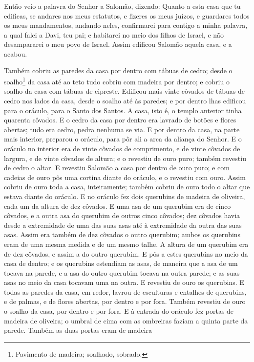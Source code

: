 Então veio a palavra do Senhor a Salomão, dizendo: Quanto
a esta casa que tu edificas, se andares nos meus estatutos, e
fizeres os meus juízos, e guardares todos os meus mandamentos,
andando neles, confirmarei para contigo a minha palavra, a qual
falei a Davi, teu pai; e habitarei no meio dos filhos de
Israel, e não desampararei o meu povo de Israel. Assim
edificou Salomão aquela casa, e a acabou.

Também cobriu as paredes da casa por dentro com tábuas de cedro;
desde o soalho\footnote{Pavimento de madeira; soalhado, sobrado.} da
casa até ao teto tudo cobriu com madeira por dentro; e cobriu o
soalho da casa com tábuas de cipreste. Edificou mais vinte
côvados de tábuas de cedro nos lados da casa, desde o soalho até às
paredes; e por dentro lhas edificou para o oráculo, para o Santo dos
Santos. A casa, isto é, o templo anterior tinha quarenta
côvados. E o cedro da casa por dentro era lavrado de botões e
flores abertas; tudo era cedro, pedra nenhuma se via. E por
dentro da casa, na parte mais interior, preparou o oráculo, para pôr
ali a arca da aliança do Senhor. E o oráculo no interior era
de vinte côvados de comprimento, e de vinte côvados de largura, e de
vinte côvados de altura; e o revestiu de ouro puro; também revestiu
de cedro o altar. E revestiu Salomão a casa por dentro de
ouro puro; e com cadeias de ouro pôs uma cortina diante do oráculo,
e o revestiu com ouro. Assim cobriu de ouro toda a casa,
inteiramente; também cobriu de ouro todo o altar que estava diante
do oráculo. E no oráculo fez dois querubins de madeira de
oliveira, cada um da altura de dez côvados. E uma asa de um
querubim era de cinco côvados, e a outra asa do querubim de outros
cinco côvados; dez côvados havia desde a extremidade de uma das suas
asas até à extremidade da outra das suas asas. Assim era
também de dez côvados o outro querubim; ambos os querubins eram de
uma mesma medida e de um mesmo talhe. A altura de um querubim
era de dez côvados, e assim a do outro querubim. E pôs a
estes querubins no meio da casa de dentro; e os querubins estendiam
as asas, de maneira que a asa de um tocava na parede, e a asa do
outro querubim tocava na outra parede; e as suas asas no meio da
casa tocavam uma na outra. E revestiu de ouro os querubins.
E todas as paredes da casa, em redor, lavrou de esculturas e
entalhes de querubins, e de palmas, e de flores abertas, por dentro
e por fora. Também revestiu de ouro o soalho da casa, por
dentro e por fora. E à entrada do oráculo fez portas de
madeira de oliveira; o umbral de cima com as ombreiras faziam a
quinta parte da parede. Também as duas portas eram de madeira
